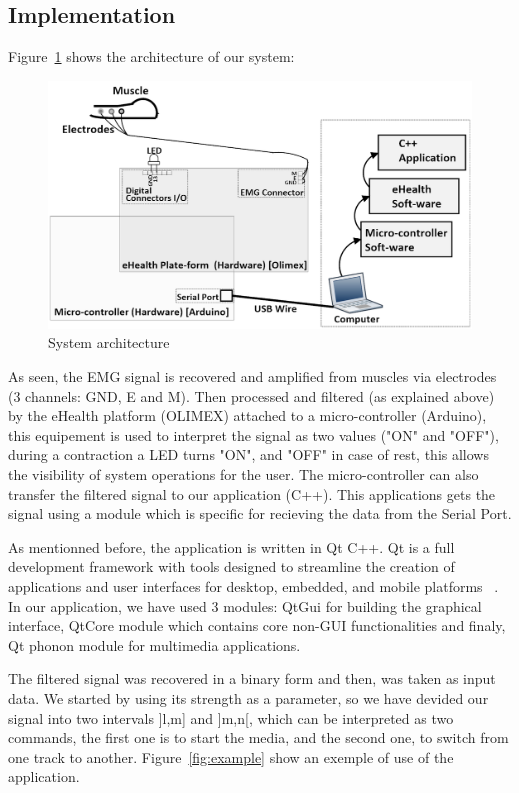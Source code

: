 \documentclass[conference]{IEEEtran}
\begin{document}
\subsection{Implementation}\par

Figure~\ref{fig:architecture} shows the architecture of our system:

\begin{figure}[!hb]
    \includegraphics[scale=0.23]{architecture.png}
    \caption{System architecture}
    \label{fig:architecture}
\end{figure}


As seen, the EMG signal is recovered and amplified from muscles via electrodes (3 channels: GND, E and M). Then processed and filtered (as explained above) by the eHealth platform (OLIMEX) attached to a micro-controller (Arduino), this equipement is used to interpret the signal as two values ("ON" and "OFF"), during a contraction a LED turns "ON", and "OFF" in case of rest, this allows the visibility of system operations for the user. The micro-controller can also transfer the filtered signal to our application (C++). This applications gets the signal using a module which is specific for recieving the data from the Serial Port.\par
As mentionned before, the application is written in Qt C++. Qt is a full development framework with tools designed to streamline the creation of applications and user interfaces for desktop, embedded, and mobile platforms ~\cite{Doc}. In our application, we have used 3 modules: QtGui for building the graphical interface, QtCore module which contains core non-GUI functionalities and finaly, Qt phonon module for multimedia applications.
\par
The filtered signal was recovered in a binary form and then, was taken as input data. We started by using its strength as a parameter, so we have devided our signal into two intervals ]l,m] and ]m,n[, which can be interpreted as two commands, the first one is to start the media, and the second one, to switch from one track to another. Figure~\ref{fig:example} show an exemple of use of the application.
\end{document}
